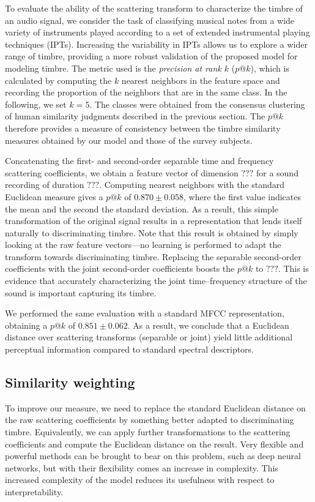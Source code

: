 \documentclass[10pt,letterpaper]{article}
\makeatletter
\newcommand{\patk}{p\mathrm{@}k}
\makeatother
\begin{document}
To evaluate the ability of the scattering transform to characterize the timbre of an audio signal, we consider the task of classifying musical notes from a wide variety of instruments played according to a set of extended instrumental playing techniques (IPTs).
Increasing the variability in IPTs allows us to explore a wider range of timbre, providing a more robust validation of the proposed model for modeling timbre.
The metric used is the \emph{precision at rank $k$} ($\patk$), which is calculated by computing the $k$ nearest neighbors in the feature space and recording the proportion of the neighbors that are in the same class.
In the following, we set $k = 5$.
The classes were obtained from the consensus clustering of human similarity judgments described in the previous section.
The $\patk$ therefore provides a measure of consistency between the timbre similarity measures obtained by our model and those of the survey subjects.

Concatenating the first- and second-order separable time and frequency scattering coefficients, we obtain a feature vector of dimension $???$ for a sound recording of duration $???$.
Computing nearest neighbors with the standard Euclidean measure gives a $\patk$ of $0.870 \pm 0.058$, where the first value indicates the mean and the second the standard deviation.
As a result, this simple transformation of the original signal results in a representation that lends itself naturally to discriminating timbre.
Note that this result is obtained by simply looking at the raw feature vectors---no learning is performed to adapt the transform towards discriminating timbre.
Replacing the separable second-order coefficients with the joint second-order coefficients boosts the $\patk$ to $???$.
This is evidence that accurately characterizing the joint time--frequency structure of the sound is important capturing its timbre.

We performed the same evaluation with a standard MFCC representation, obtaining a $\patk$ of $0.851 \pm 0.062$.
As a result, we conclude that a Euclidean distance over scattering transforms (separable or joint) yield little additional perceptual information compared to standard spectral descriptors.

\subsection*{Similarity weighting}
\label{sec:weighting}

To improve our measure, we need to replace the standard Euclidean distance on the raw scattering coefficients by something better adapted to discriminating timbre.
Equivalently, we can apply further transformations to the scattering coefficients and compute the Euclidean distance on the result.
Very flexible and powerful methods can be brought to bear on this problem, such as deep neural networks, but with their flexibility comes an increase in complexity.
This increased complexity of the model reduces its usefulness with respect to interpretability.
\end{document}
